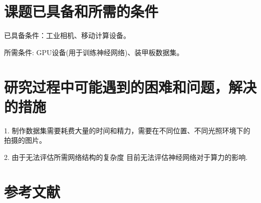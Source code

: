\section{课题已具备和所需的条件}
已具备条件：工业相机、移动计算设备。 \par
所需条件: GPU设备(用于训练神经网络)、装甲板数据集。 \par
\section{研究过程中可能遇到的困难和问题，解决的措施}
1. 制作数据集需要耗费大量的时间和精力，需要在不同位置、不同光照环境下的拍摄的图片。 \par
2. 由于无法评估所需网络结构的复杂度 目前无法评估神经网络对于算力的影响. \par
\newpage
\section{参考文献}




